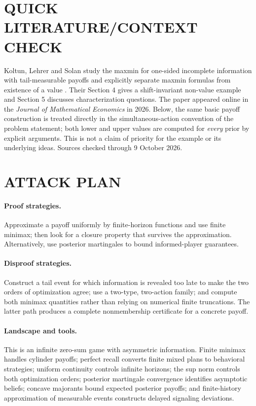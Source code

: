 \documentclass[11pt,a4paper]{article}
\theoremstyle{definition}
\theoremstyle{remark}
\begin{document}
\section{QUICK LITERATURE/CONTEXT CHECK}
Koltun, Lehrer and Solan study the maxmin for one-sided incomplete information with tail-measurable payoffs and explicitly separate maxmin formulas from existence of a value \cite{c738-kls}. Their Section 4 gives a shift-invariant non-value example and Section 5 discusses characterization questions. The paper appeared online in the \emph{Journal of Mathematical Economics} in 2026. Below, the same basic payoff construction is treated directly in the simultaneous-action convention of the problem statement; both lower and upper values are computed for \emph{every} prior by explicit arguments. This is not a claim of priority for the example or its underlying ideas. Sources checked through 9 October 2026.

\section{ATTACK PLAN}
\paragraph{Proof strategies.}
Approximate a payoff uniformly by finite-horizon functions and use finite minimax; then look for a closure property that survives the approximation. Alternatively, use posterior martingales to bound informed-player guarantees.

\paragraph{Disproof strategies.}
Construct a tail event for which information is revealed too late to make the two orders of optimization agree; use a two-type, two-action family; and compute both minimax quantities rather than relying on numerical finite truncations. The latter path produces a complete nonmembership certificate for a concrete payoff.

\paragraph{Landscape and tools.}
This is an infinite zero-sum game with asymmetric information. Finite minimax handles cylinder payoffs; perfect recall converts finite mixed plans to behavioral strategies; uniform continuity controls infinite horizons; the sup norm controls both optimization orders; posterior martingale convergence identifies asymptotic beliefs; concave majorants bound expected posterior payoffs; and finite-history approximation of measurable events constructs delayed signaling deviations.
\end{document}
